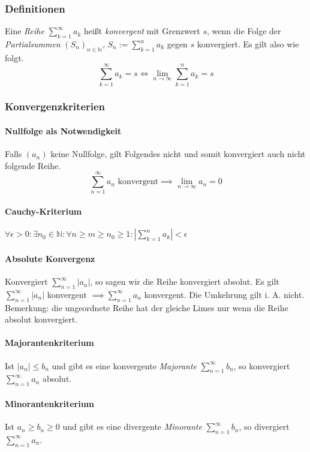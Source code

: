 \documentclass[a4paper, 9pt, DIV=24]{scrartcl}
\newcommand{\N}{\mathbb{N}}
\begin{document}
\subsubsection{Definitionen}
Eine \emph{Reihe} $\sum_{k = 1}^\infty a_k$ heißt \emph{konvergent} mit Grenzwert $s$, wenn die Folge der \emph{Partialsummen}
$(S_n)_{n \in \N}$, $S_n := \sum_{k=1}^n a_k$ gegen $s$ konvergiert. Es gilt also wie folgt.
\[ \sum_{k=1}^\infty a_k = s \iff \lim_{n\rightarrow\infty} \sum_{k=1}^n a_k = s \]

\subsubsection{Konvergenzkriterien}

\paragraph{Nullfolge als Notwendigkeit}
Falls $(a_n)$ keine Nullfolge, gilt Folgendes nicht und somit konvergiert auch nicht folgende Reihe.
\[ \sum_{n=1}^\infty a_n \text{ konvergent} \implies \lim_{n \to \infty} a_n = 0 \]

\paragraph{Cauchy-Kriterium}
$\forall \epsilon > 0: \exists n_0 \in \N: \forall n \geq m \geq n_0 \geq 1: | \sum_{k=1}^n a_k | < \epsilon$

\paragraph{Absolute Konvergenz}
Konvergiert $\sum_{n=1}^\infty |a_n|$, so sagen wir die Reihe konvergiert absolut.
Es gilt $\sum_{n=1}^\infty |a_n|$ konvergent $ \implies \sum_{n=1}^\infty a_n$ konvergent.
Die Umkehrung gilt i. A. nicht. Bemerkung: die ungeordnete Reihe hat der gleiche Limes nur wenn die Reihe absolut konvergiert.

\paragraph{Majorantenkriterium}
Ist $|a_n| \leq b_n$ und gibt es eine konvergente \emph{Majorante} $\sum_{n=1}^\infty b_n$, so konvergiert $\sum_{n=1}^\infty a_n$ absolut.

\paragraph{Minorantenkriterium}
Ist $a_n \geq b_n \geq 0$ und gibt es eine divergente \emph{Minorante} $\sum_{n=1}^\infty b_n$, so divergiert $\sum_{n=1}^\infty a_n$.
\end{document}
